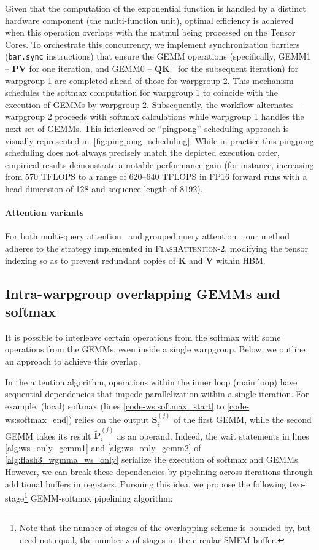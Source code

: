 \begin{enumerate}
Given that the computation of the exponential function is handled by a distinct hardware component (the multi-function unit), optimal efficiency is achieved when this operation overlaps with the matmul being processed on the Tensor Cores. To orchestrate this concurrency, we implement synchronization barriers (\texttt{bar.sync} instructions) that ensure the GEMM operations (specifically, GEMM1 -- $\mathbf{P} \mathbf{V}$ for one iteration, and GEMM0 -- $\mathbf{Q} \mathbf{K}^\top$ for the subsequent iteration) for warpgroup 1 are completed ahead of those for warpgroup 2. This mechanism schedules the softmax computation for warpgroup 1 to coincide with the execution of GEMMs by warpgroup 2. Subsequently, the workflow alternates—warpgroup 2 proceeds with softmax calculations while warpgroup 1 handles the next set of GEMMs. This interleaved or ``pingpong’’ scheduling approach is visually represented in~\cref{fig:pingpong_scheduling}. While in practice this pingpong scheduling does not always precisely match the depicted execution order, empirical results demonstrate a notable performance gain (for instance, increasing from 570 TFLOPS to a range of 620--640 TFLOPS in FP16 forward runs with a head dimension of 128 and sequence length of 8192).

\paragraph{Attention variants} For both multi-query attention~\citep{shazeer2019fast} and grouped query attention~\citep{ainslie2023gqa}, our method adheres to the strategy implemented in \textsc{FlashAttention-2}, modifying the tensor indexing so as to prevent redundant copies of $\mathbf{K}$ and $\mathbf{V}$ within HBM.

\subsection{Intra-warpgroup overlapping GEMMs and softmax}

It is possible to interleave certain operations from the softmax with some operations from the GEMMs, even inside a single warpgroup. Below, we outline an approach to achieve this overlap.

In the attention algorithm, operations within the inner loop (main loop) have sequential dependencies that impede parallelization within a single iteration. For example, (local) softmax (lines \ref{code-ws:softmax_start} to \ref{code-ws:softmax_end}) relies on the output $\mathbf{S}_i^{(j)}$ of the first GEMM, while the second GEMM takes its result $\widetilde{\mathbf{P}}_i^{(j)}$ as an operand. Indeed, the wait statements in lines \ref{alg:ws_only_gemm1} and \ref{alg:ws_only_gemm2} of \cref{alg:flash3_wgmma_ws_only} serialize the execution of softmax and GEMMs. However, we can break these dependencies by pipelining across iterations through additional buffers in registers. Pursuing this idea, we propose the following two-stage\footnote{Note that the number of stages of the overlapping scheme is bounded by, but need not equal, the number $s$ of stages in the circular SMEM buffer.} GEMM-softmax pipelining algorithm:


\end{enumerate}
